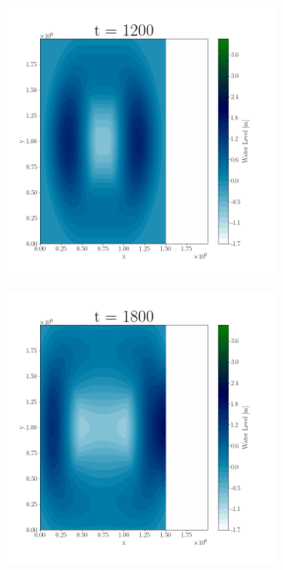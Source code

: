 \begin{figure}[H]
\begin{subfigure}[b]{.4\linewidth}
\includegraphics[width=\linewidth]{Figures/5-3.png}
\caption{}
\end{subfigure}
\begin{subfigure}[b]{.4\linewidth}
\includegraphics[width=\linewidth]{Figures/5-4.png}
\caption{}
\end{subfigure}


\end{figure}
